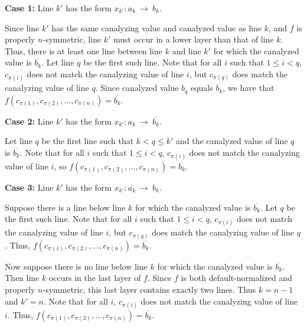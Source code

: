 \medskip

\noindent
{\bf Case 1:} Line $k'$ has the form  $x_{k'} : a_k ~\longrightarrow~ b_k$.  

\smallskip

Since line $k'$
has the same canalyzing value and canalyzed value as line $k$, and
$f$ is properly $n$-symmetric, line $k'$ must occur in a lower layer
than that of line $k$.  Thus, there is at least one line between
line $k$ and line $k'$ for which the canalyzed value is $\overline{b_k}$.
Let line $q$ be the first such line.  Note that for all $i$ such
that $1 \leq i < q$, $c_{\pi(i)}$ does not match the canalyzing
value of line $i$, but $c_{\pi(q)}$ does match the canalyzing value
of line $q$.  Since canalyzed value $b_q$ equals $\overline{b_k}$,
we have that $f(c_{\pi(1)}, c_{\pi(2)}, \ldots, c_{\pi(n)}) =
\overline{b_k}$.

\medskip

\noindent
{\bf Case 2:} Line $k'$ has the form $x_{k'} : a_k ~\longrightarrow~ \overline{b_k}$.

\smallskip

Let line $q$ be the first line such that $k < q \leq k'$ and
the canalyzed value of line $q$ is $\overline{b_k}$.
Note that for all $i$ such that $1 \leq i < q$, 
$c_{\pi(i)}$ does not match the canalyzing value of line $i$,
so $f(c_{\pi(1)}, c_{\pi(2)}, \ldots, c_{\pi(n)}) = \overline{b_k}$.

\medskip

\noindent
{\bf Case 3:} Line $k'$ has the form $x_{k'} : \overline{a_k} ~\longrightarrow~ b_k$. 

\smallskip

Suppose there is a line below line $k$ for which the canalyzed
value is $\overline{b_k}$.  Let $q$ be the first such line.  Note
that for all $i$ such that $1 \leq i < q$, $c_{\pi(i)}$ does not
match the canalyzing value of line $i$, but $c_{\pi(q)}$ does match
the canalyzing value of line $q$.  Thus, $f(c_{\pi(1)}, c_{\pi(2)},
\ldots, c_{\pi(n)}) = \overline{b_k}$.

Now suppose there is no line below line $k$ for which the canalyzed
value is $\overline{b_k}$.  
Then line $k$ occurs in the last layer of $f$.  
Since $f$ is both default-normalized and properly $n$-symmetric,
this last layer contains exactly two lines.  Thus $k = n-1$ and $k'
= n$.  Note that for all $i$, $c_{\pi(i)}$ does not match the
canalyzing value of line $i$.  Thus, $f(c_{\pi(1)}, c_{\pi(2)},
\ldots, c_{\pi(n)}) = \overline{b_k}$.

